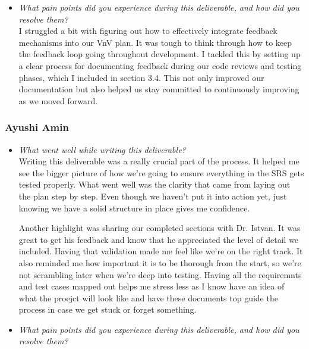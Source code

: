 \documentclass[12pt, titlepage]{article}
\begin{document}
\begin{appendices}
\begin{itemize}
      \item \textit{What pain points did you experience during this
        deliverable, and how did you resolve them?}\\

        I struggled a bit with figuring out how to effectively
        integrate feedback mechanisms into our VnV plan. It was tough
        to think through how to keep the feedback loop going
        throughout development. I tackled this by setting up a clear
        process for documenting feedback during our code reviews and
        testing phases, which I included in section 3.4. This not
        only improved our documentation but also helped us stay
        committed to continuously improving as we moved forward.

    \end{itemize}

    \subsubsection*{Ayushi Amin}
    \begin{itemize}
      \item \textit{What went well while writing this deliverable?} \\

        Writing this deliverable was a really crucial part of the process. It
        helped me see the bigger picture of how we’re going to ensure everything
        in the SRS gets tested properly. What went well was the
        clarity that came
        from laying out the plan step by step. Even though we haven’t
        put it into
        action yet, just knowing we have a solid structure in place
        gives me confidence.

        Another highlight was sharing our completed sections with Dr. Istvan. It
        was great to get his feedback and know that he appreciated the level of
        detail we included. Having that validation made me feel like
        we’re on the
        right track. It also reminded me how important it is to be thorough from
        the start, so we’re not scrambling later when we’re deep into testing.
        Having all the requiremnts and test cases mapped out helps me
        stress less
        as I know have an idea of what the proejct will look like and have these
        documents top guide the process in case we get stuck or
        forget something.

      \item \textit{What pain points did you experience during this
        deliverable, and how did you resolve them?}\\


\end{itemize}
\end{appendices}
\end{document}
